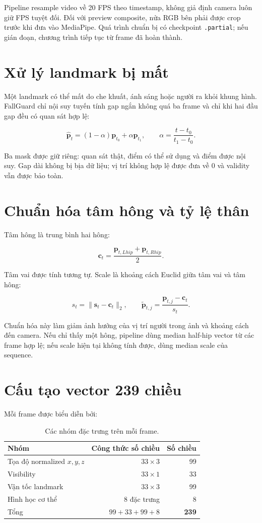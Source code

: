 \documentclass[12pt,a4paper,oneside]{report}
\newcommand{\code}[1]{\texttt{#1}}
\begin{document}
Pipeline resample video về 20 FPS theo timestamp, không giả định camera luôn giữ
FPS tuyệt đối. Đối với preview composite, nửa RGB bên phải được crop trước khi
đưa vào MediaPipe. Quá trình chuẩn bị có checkpoint \code{.partial}; nếu gián
đoạn, chương trình tiếp tục từ frame đã hoàn thành.

\section{Xử lý landmark bị mất}

Một landmark có thể mất do che khuất, ánh sáng hoặc người ra khỏi khung hình.
FallGuard chỉ nội suy tuyến tính gap ngắn không quá ba frame và chỉ khi hai đầu
gap đều có quan sát hợp lệ:

\[
\hat{\mathbf{p}}_{t}=(1-\alpha)\mathbf{p}_{t_0}
 +\alpha\mathbf{p}_{t_1},\qquad
\alpha=\frac{t-t_0}{t_1-t_0}.
\]

Ba mask được giữ riêng: quan sát thật, điểm có thể sử dụng và điểm được nội suy.
Gap dài không bị bịa dữ liệu; vị trí không hợp lệ được đưa về 0 và validity vẫn
được bảo toàn.

\section{Chuẩn hóa tâm hông và tỷ lệ thân}

Tâm hông là trung bình hai hông:

\[
\mathbf{c}_t=\frac{\mathbf{p}_{t,Lhip}+\mathbf{p}_{t,Rhip}}{2}.
\]

Tâm vai được tính tương tự. Scale là khoảng cách Euclid giữa tâm vai và tâm hông:

\[
s_t=\lVert \mathbf{s}_t-\mathbf{c}_t\rVert_2,
\qquad
\tilde{\mathbf{p}}_{t,j}=\frac{\mathbf{p}_{t,j}-\mathbf{c}_t}{s_t}.
\]

Chuẩn hóa này làm giảm ảnh hưởng của vị trí người trong ảnh và khoảng cách đến
camera. Nếu chỉ thấy một hông, pipeline dùng median half-hip vector từ các frame
hợp lệ; nếu scale hiện tại không tính được, dùng median scale của sequence.

\section{Cấu tạo vector 239 chiều}

Mỗi frame được biểu diễn bởi:

\begin{table}[H]
\centering
\caption{Các nhóm đặc trưng trên mỗi frame.}
\begin{tabularx}{\textwidth}{Yrr}
\toprule
Nhóm & Công thức số chiều & Số chiều \\
\midrule
Tọa độ normalized $x,y,z$ & $33\times3$ & 99 \\
Visibility & $33\times1$ & 33 \\
Vận tốc landmark & $33\times3$ & 99 \\
Hình học cơ thể & 8 đặc trưng & 8 \\
\midrule
Tổng & $99+33+99+8$ & \textbf{239} \\
\bottomrule
\end{tabularx}
\end{table}
\end{document}
